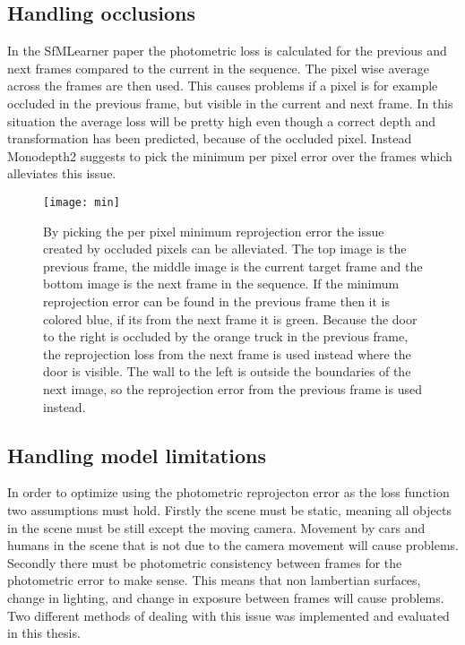 \subsection{Handling occlusions}
\label{sec:occlusion}

\iffalse
\paragraph{Disparity loss} To encourage background depths (low disparities) in shadows of the depth map where occlusion has occurred a penalty on the disparity can be added $ \mathcal{L}_{o} =|d_t|. $
\fi

In the SfMLearner paper the photometric loss is calculated for the previous and next frames compared to the current in the sequence. The pixel wise average across the frames are then used. This causes problems if a pixel is for example occluded in the previous frame, but visible in the current and next frame. In this situation the average loss will be pretty high even though a correct depth and transformation has been predicted, because of the occluded pixel. Instead Monodepth2 suggests to pick the minimum per pixel error over the frames which alleviates this issue. 

\begin{figure}[H]
	\centering
	\texttt{[image: min]}
	\caption{By picking the per pixel minimum reprojection error the issue created by occluded pixels can be alleviated. The top image is the previous frame, the middle image is the current target frame and the bottom image is the next frame in the sequence. If the minimum reprojection error can be found in the previous frame then it is colored blue, if its from the next frame it is green. Because the door to the right is occluded by the orange truck in the previous frame, the reprojection loss from the next frame is used instead where the door is visible. The wall to the left is outside the boundaries of the next image, so the reprojection error from the previous frame is used instead.}
	\label{fig:min}
\end{figure}

\subsection{Handling model limitations}
\label{sec:modellimit}

In order to optimize using the photometric reprojecton error as the loss function two assumptions must hold. Firstly the scene must be static, meaning all objects in the scene must be still except the moving camera. Movement by cars and humans in the scene that is not due to the camera movement will cause problems. Secondly there must be photometric consistency between frames for the photometric error to make sense. This means that non lambertian surfaces, change in lighting, and change in exposure between frames will cause problems. Two different methods of dealing with this issue was implemented and evaluated in this thesis.

